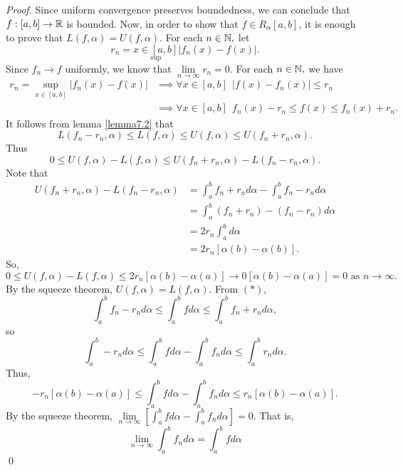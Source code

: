 \begin{proof}
    Since uniform convergence preserves boundedness, we can conclude that $f: [a,b] \to \mathbb{R}$ is bounded. Now, in order to show that $f \in R_\alpha[a,b]$, it is enough to prove that $L(f, \alpha) = U(f, \alpha)$. For each $n \in \mathbb{N},$ let
    $$r_n = \underset{\sup}{x \in [a,b]}|f_n(x) - f(x)|.$$
    Since $f_n \to f$ uniformly, we know that $\lim \limits_{n \to \infty}r_n = 0$. For each $n \in \mathbb{N},$ we have 
    \begin{align*}
        r_n = \underset{x \in [a,b]}{\sup}\left|f_n(x) - f(x)\right| &\implies \forall x \in [a,b] ~~|f(x) - f_n(x)| \leq r_n \\
        &\implies \forall x \in [a,b] ~~f_n(x) - r_n \leq f(x) \leq f_n(x) + r_n. \tag{$*$}
    \end{align*}
    It follows from lemma \ref{lemma7.2} that
    \[L(f_n - r_n, \alpha) \leq L(f, \alpha) \leq U(f, \alpha) \leq U(f_n+r_n, \alpha).\]
    Thus
    \[0 \leq U(f, \alpha) - L(f, \alpha) \leq U(f_n+r_n, \alpha) - L(f_n - r_n, \alpha).\]
    Note that
    \begin{align*}
        U(f_n + r_n, \alpha) - L(f_n - r_n, \alpha) &= \int_a^b f_n+r_n d\alpha - \int_a^b f_n - r_n d\alpha \tag{$f_n$'s are integrable} \\
        &= \int_a^b (f_n +r_n) - (f_n-r_n) d \alpha \\
        &= 2r_n \int_a^b d \alpha \\
        &= 2r_n [\alpha(b) - \alpha(b)].
    \end{align*}
    So,
    \[0 \leq U(f, \alpha) - L(f, \alpha) \leq 2r_n[\alpha(b) - \alpha(a)] \to 0 [\alpha(b) - \alpha(a)] = 0 \text{ as }n \to \infty.\]
    By the squeeze theorem, $U(f, \alpha) = L(f, \alpha)$. From $(*)$,
    $$\int_a^bf_n - r_n d\alpha \leq \int_a^b fd\alpha \leq \int_a^b f_n+r_n d\alpha,$$
    so
    $$\int_a^b-r_n d\alpha \leq \int_a^b f d\alpha - \int_a^b f_n d\alpha \leq \int_a^b r_n d\alpha.$$
    Thus,
    \[-r_n[\alpha(b) - \alpha(a)] \leq \int_a^b fd\alpha - \int_a^b f_n d\alpha \leq r_n[\alpha(b) - \alpha(a)]. \]
    By the squeeze theorem, $\lim \limits_{n \to \infty}\left[\int_a^b fd\alpha - \int_a^b f_n d\alpha\right] = 0$. That is,
    \[\lim_{n\to \infty}\int_a^bf_n d\alpha = \int_a^b f d\alpha\]
    \qed
\end{proof}